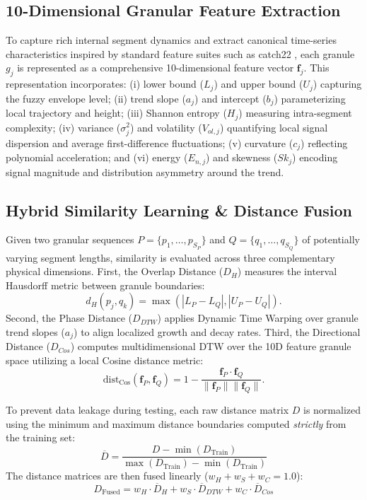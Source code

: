 \documentclass[conference]{IEEEtran}
\begin{document}
\subsection{10-Dimensional Granular Feature Extraction}
To capture rich internal segment dynamics and extract canonical time-series characteristics inspired by standard feature suites such as catch22 \cite{lubba2019}, each granule $g_j$ is represented as a comprehensive 10-dimensional feature vector $\mathbf{f}_j$. This representation incorporates: (i) lower bound ($L_j$) and upper bound ($U_j$) capturing the fuzzy envelope level; (ii) trend slope ($a_j$) and intercept ($b_j$) parameterizing local trajectory and height; (iii) Shannon entropy ($H_j$) measuring intra-segment complexity; (iv) variance ($\sigma^2_j$) and volatility ($V_{ol, j}$) quantifying local signal dispersion and average first-difference fluctuations; (v) curvature ($c_j$) reflecting polynomial acceleration; and (vi) energy ($E_{n, j}$) and skewness ($Sk_j$) encoding signal magnitude and distribution asymmetry around the trend.

\subsection{Hybrid Similarity Learning \& Distance Fusion}
Given two granular sequences $P = \{p_1, \dots, p_{S_P}\}$ and $Q = \{q_1, \dots, q_{S_Q}\}$ of potentially varying segment lengths, similarity is evaluated across three complementary physical dimensions. First, the Overlap Distance ($D_H$) measures the interval Hausdorff metric between granule boundaries:
\begin{equation}
d_H(p_j, q_k) = \max \left( |L_P - L_Q|, |U_P - U_Q| \right).
\label{eq:hausdorff_dist}
\end{equation}
Second, the Phase Distance ($D_{DTW}$) applies Dynamic Time Warping \cite{sakoe1978} over granule trend slopes ($a_j$) to align localized growth and decay rates. Third, the Directional Distance ($D_{Cos}$) computes multidimensional DTW over the 10D feature granule space utilizing a local Cosine distance metric:
\begin{equation}
\text{dist}_{\text{Cos}}(\mathbf{f}_P, \mathbf{f}_Q) = 1 - \frac{\mathbf{f}_P \cdot \mathbf{f}_Q}{\|\mathbf{f}_P\| \|\mathbf{f}_Q\|}.
\label{eq:cosine_dist}
\end{equation}

To prevent data leakage during testing, each raw distance matrix $D$ is normalized using the minimum and maximum distance boundaries computed \textit{strictly} from the training set:
\begin{equation}
\overline{D} = \frac{D - \min(D_{\text{Train}})}{\max(D_{\text{Train}}) - \min(D_{\text{Train}})}
\label{eq:normalized_dist}
\end{equation}
The distance matrices are then fused linearly ($w_H + w_S + w_C = 1.0$):
\begin{equation}
D_{\text{Fused}} = w_H \cdot \overline{D}_H + w_S \cdot \overline{D}_{DTW} + w_C \cdot \overline{D}_{Cos}
\label{eq:fused_dist}
\end{equation}
\end{document}
